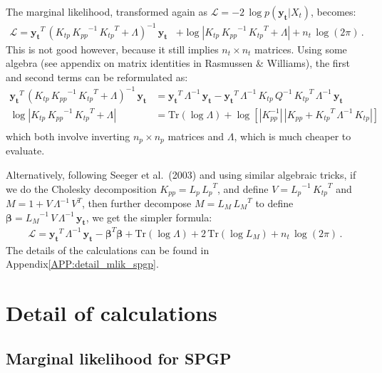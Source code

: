 \documentclass[11pt,a4paper]{article}
\newcommand\rapp[1]{Appendix\;\ref{#1}}
\newcommand{\abs}[1]{\left| #1 \right|}
\newcommand{\tr}{\text{Tr}}
\numberwithin{equation}{section}
\begin{document}
The marginal likelihood, transformed again as $\mathcal{L} = -2\,\log p(\mathbf{y_t} | X_t)$, becomes:
\begin{align}
\mathcal{L} = \mathbf{y_t}^T\,(K_{tp}\,{K_{pp}}^{-1}\,{K_{tp}}^T + \Lambda)^{-1}\,\mathbf{y_t} &+ \log \abs{K_{tp}\,{K_{pp}}^{-1}\,{K_{tp}}^T + \Lambda} + n_t\,\log(2\pi)\,.
\end{align}
This is not good however, because it still implies $n_t \times n_t$ matrices. Using some algebra (see appendix on matrix identities in Rasmussen \& Williams), the first and second terms can be reformulated as:
\begin{align}
\mathbf{y_t}^T\,(K_{tp}\,{K_{pp}}^{-1}\,{K_{tp}}^T + \Lambda)^{-1}\,\mathbf{y_t} &= \mathbf{y_t}^T\,\Lambda^{-1}\,\mathbf{y_t} - \mathbf{y_t}^T\,\Lambda^{-1}\,K_{tp}\,Q^{-1}\,{K_{tp}}^T\,\Lambda^{-1}\,\mathbf{y_t}\, \\
\log \abs{K_{tp}\,{K_{pp}}^{-1}\,{K_{tp}}^T + \Lambda} &= \tr\left(\log \Lambda\right) + \log\left[\abs{K_{pp}^{-1}}\,\abs{K_{pp} + {K_{tp}}^T\,\Lambda^{-1}\,K_{tp}}\right] \nonumber \\
\end{align}
which both involve inverting $n_p \times n_p$ matrices and $\Lambda$, which is much cheaper to evaluate.

Alternatively, following Seeger et al.~(2003) and using similar algebraic tricks, if we do the Cholesky decomposition $K_{pp} = L_p\,{L_p}^T$, and define $V = {L_p}^{-1}\,{K_{tp}}^T$ and $M = 1 + V\,\Lambda^{-1}\,V^T$, then further decompose $M = L_M\,{L_M}^{T}$ to define ${\bm \beta} = {L_M}^{-1}\,V\,\Lambda^{-1}\,\mathbf{y_t}$, we get the simpler formula:
\begin{align}
\mathcal{L} = \mathbf{y_t}^T\,\Lambda^{-1}\,\mathbf{y_t} - {\bm \beta}^{T} {\bm \beta} + \tr\left(\log \Lambda\right) + 2\,\tr\left(\log L_M\right) + n_t\,\log(2\pi)\,.
\end{align}
The details of the calculations can be found in \rapp{APP:detail_mlik_spgp}.

\appendix

\section{Detail of calculations}

\subsection{Marginal likelihood for SPGP \label{APP:detail_mlik_spgp}}
\end{document}
